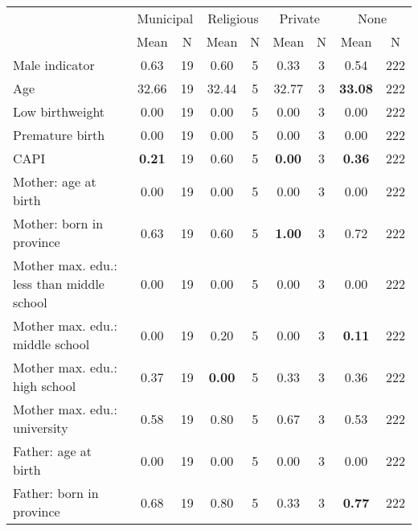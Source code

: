 \begin{tabular}{l c c c c c c c c}
\toprule
& \multicolumn{2}{c}{Municipal} & \multicolumn{2}{c}{Religious} & \multicolumn{2}{c}{Private} & \multicolumn{2}{c}{None} \\
& \scriptsize Mean & \scriptsize N & \scriptsize Mean & \scriptsize N & \scriptsize Mean & \scriptsize N & \scriptsize Mean & \scriptsize N \\
\midrule
Male indicator &      0.63 &        19 &      0.60 &         5 &      0.33 &         3 &      0.54 &       222 \\
Age &     32.66 &        19 &     32.44 &         5 &     32.77 &         3 & \textbf{    33.08} &       222 \\
Low birthweight &      0.00 &        19 &      0.00 &         5 &      0.00 &         3 &      0.00 &       222 \\
Premature birth &      0.00 &        19 &      0.00 &         5 &      0.00 &         3 &      0.00 &       222 \\
CAPI & \textbf{     0.21} &        19 &      0.60 &         5 & \textbf{     0.00} &         3 & \textbf{     0.36} &       222 \\
Mother: age at birth &      0.00 &        19 &      0.00 &         5 &      0.00 &         3 &      0.00 &       222 \\
Mother: born in province &      0.63 &        19 &      0.60 &         5 & \textbf{     1.00} &         3 &      0.72 &       222 \\
Mother max. edu.: less than middle school &      0.00 &        19 &      0.00 &         5 &      0.00 &         3 &      0.00 &       222 \\
Mother max. edu.: middle school &      0.00 &        19 &      0.20 &         5 &      0.00 &         3 & \textbf{     0.11} &       222 \\
Mother max. edu.: high school &      0.37 &        19 & \textbf{     0.00} &         5 &      0.33 &         3 &      0.36 &       222 \\
Mother max. edu.: university &      0.58 &        19 &      0.80 &         5 &      0.67 &         3 &      0.53 &       222 \\
Father: age at birth &      0.00 &        19 &      0.00 &         5 &      0.00 &         3 &      0.00 &       222 \\
Father: born in province &      0.68 &        19 &      0.80 &         5 &      0.33 &         3 & \textbf{     0.77} &       222 \\

\end{tabular}
